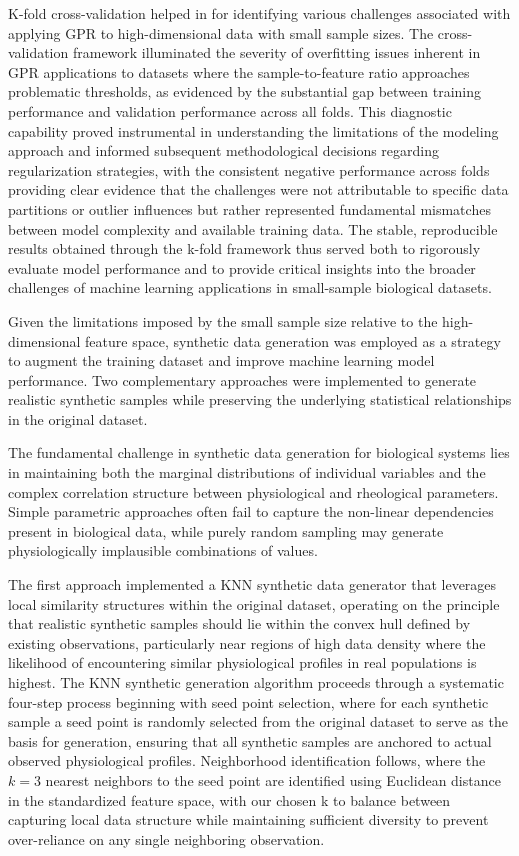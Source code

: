 \documentclass[12pt,letterpaper]{article}
\begin{document}
K-fold cross-validation helped in for identifying various challenges associated with applying GPR to high-dimensional data with small sample sizes.
The cross-validation framework illuminated the severity of overfitting issues inherent in GPR applications to datasets where the sample-to-feature ratio approaches problematic thresholds,
as evidenced by the substantial gap between training performance and validation performance across all folds. This diagnostic capability proved instrumental in understanding the
limitations of the modeling approach and informed subsequent methodological decisions regarding regularization strategies, with the consistent negative performance across folds
providing clear evidence that the challenges were not attributable to specific data partitions or outlier influences but rather represented fundamental mismatches between model
complexity and available training data. The stable, reproducible results obtained through the k-fold framework thus served both to rigorously evaluate model performance and to provide
critical insights into the broader challenges of machine learning applications in small-sample biological datasets.

Given the limitations imposed by the small sample size relative to the high-dimensional feature space, synthetic data generation was employed as a strategy
to augment the training dataset and improve machine learning model performance. Two complementary approaches were implemented to generate realistic synthetic
samples while preserving the underlying statistical relationships in the original dataset.

The fundamental challenge in synthetic data generation for biological systems lies in maintaining both the marginal distributions of individual variables
and the complex correlation structure between physiological and rheological parameters. Simple parametric approaches often fail to capture the non-linear dependencies
present in biological data, while purely random sampling may generate physiologically implausible combinations of values.

The first approach implemented a KNN synthetic data generator that leverages local similarity structures within the original dataset,
operating on the principle that realistic synthetic samples should lie within the convex hull defined by existing observations, particularly near regions of high data density where
the likelihood of encountering similar physiological profiles in real populations is highest. The KNN synthetic generation algorithm proceeds through a systematic four-step process
beginning with seed point selection, where for each synthetic sample a seed point is randomly selected from the original dataset to serve as the basis for generation, ensuring that
all synthetic samples are anchored to actual observed physiological profiles. Neighborhood identification follows, where the $k=3$ nearest neighbors to the seed point are identified
using Euclidean distance in the standardized feature space, with our chosen k to balance between capturing local data structure while maintaining sufficient diversity to
prevent over-reliance on any single neighboring observation.
\end{document}
